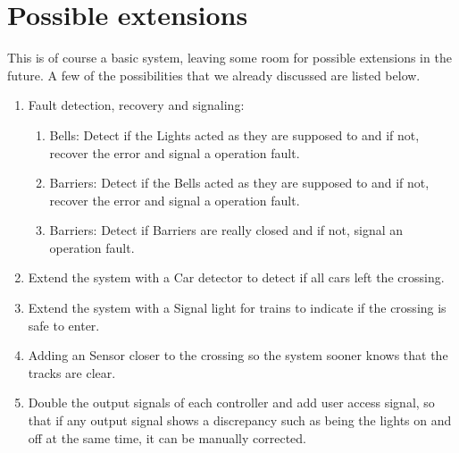 \documentclass[final]{report}
\begin{document}
\section{Possible extensions}
This is of course a basic system, leaving some room for possible extensions in the future.
A few of the possibilities that we already discussed are listed below.

	\begin{enumerate}
	\item Fault detection, recovery and signaling:
		\begin{enumerate}
			\item Bells: Detect if the Lights acted as they are supposed to and if not, recover the error and signal a operation fault.
			\item Barriers: Detect if the Bells acted as they are supposed to and if not, recover the error and signal a operation fault.
			\item Barriers: Detect if Barriers are really closed and if not, signal an operation fault.
		\end{enumerate}

	\item Extend the system with a Car detector to detect if all cars left the crossing.
	\item Extend the system with a Signal light for trains to indicate if the crossing is safe to enter.
	\item Adding an Sensor closer to the crossing so the system sooner knows that the tracks are clear.
	\item Double the output signals of each controller and add user access signal, so that if any output signal shows a discrepancy such as being the lights on and off at the same time, it can be manually corrected.
	\end{enumerate}
\end{document}
